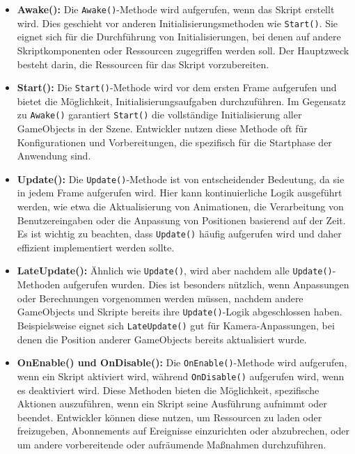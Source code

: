 \begin{itemize}
    \item \textbf{Awake():} Die \texttt{Awake()}-Methode wird aufgerufen, wenn das Skript erstellt wird. Dies geschieht
    vor anderen Initialisierungsmethoden wie \texttt{Start()}. Sie eignet sich für die Durchführung von
    Initialisierungen, bei denen auf andere Skriptkomponenten oder Ressourcen zugegriffen werden soll. Der Hauptzweck
    besteht darin, die Ressourcen für das Skript vorzubereiten.
    \item \textbf{Start():} Die \texttt{Start()}-Methode wird vor dem ersten Frame aufgerufen und bietet die
    Möglichkeit, Initialisierungsaufgaben durchzuführen. Im Gegensatz zu \texttt{Awake()} garantiert \texttt{Start()}
    die vollständige Initialisierung aller GameObjects in der Szene. Entwickler nutzen diese Methode oft für
    Konfigurationen und Vorbereitungen, die spezifisch für die Startphase der Anwendung sind.
    \item \textbf{Update():} Die \texttt{Update()}-Methode ist von entscheidender Bedeutung, da sie in jedem Frame
    aufgerufen wird. Hier kann kontinuierliche Logik ausgeführt werden, wie etwa die Aktualisierung von Animationen,
    die Verarbeitung von Benutzereingaben oder die Anpassung von Positionen basierend auf der Zeit. Es ist wichtig zu
    beachten, dass \texttt{Update()} häufig aufgerufen wird und daher effizient implementiert werden sollte.
    \item \textbf{LateUpdate():} Ähnlich wie \texttt{Update()}, wird aber nachdem alle \texttt{Update()}-Methoden
    aufgerufen wurden. Dies ist besonders nützlich, wenn Anpassungen oder Berechnungen vorgenommen werden müssen,
    nachdem andere GameObjects und Skripte bereits ihre \texttt{Update()}-Logik abgeschlossen haben. Beispielsweise
    eignet sich \texttt{LateUpdate()} gut für Kamera-Anpassungen, bei denen die Position anderer GameObjects bereits
    aktualisiert wurde.
    \item \textbf{OnEnable() und OnDisable():} Die \texttt{OnEnable()}-Methode wird aufgerufen, wenn ein Skript
    aktiviert wird, während \texttt{OnDisable()} aufgerufen wird, wenn es deaktiviert wird. Diese Methoden bieten
    die Möglichkeit, spezifische Aktionen auszuführen, wenn ein Skript seine Ausführung aufnimmt oder beendet.
    Entwickler können diese nutzen, um Ressourcen zu laden oder freizugeben, Abonnements auf Ereignisse
    einzurichten oder abzubrechen, oder um andere vorbereitende oder aufräumende Maßnahmen durchzuführen.
\end{itemize}


